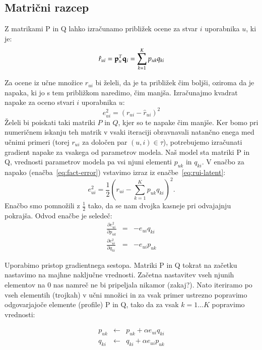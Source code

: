 \subsection{Matrični razcep}

Z matrikami P in Q lahko izračunamo približek ocene za stvar $i$ uporabnika $u$, ki je:
%
\begin{equation}\label{eq:rui-latent}
  \hat{r}_{ui}={\bf p}_u^T {\bf q}_i = \sum_{k=1}^K p_{uk} q_{ki}
\end{equation}

Za ocene iz učne množice $r_{ui}$ bi želeli, da je ta približek čim boljši, oziroma da je napaka, ki jo s tem približkom naredimo, čim manjša. Izračunajmo kvadrat napake za oceno stvari $i$ uporabnika $u$:
%
\begin{equation}\label{eq:fact-error}
  e_{ui}^2 = (r_{ui}-\hat{r}_{ui})^2
\end{equation}
%
Želeli bi poiskati taki matriki $P$ in $Q$, kjer so te napake čim manjše. Ker bomo pri numeričnem iskanju teh matrik v vsaki iteraciji obravnavali natančno enega med učnimi primeri (torej $r_{ui}$ za določen par $(u,i)\in\tau$), potrebujemo izračunati gradient napake za vsakega od parametrov modela. Naš model sta matriki P in Q, vrednosti parametrov modela pa vsi njuni elementi $p_{uk}$ in $q_{ki}$. V enačbo za napako (enačba~\ref{eq:fact-error}) vstavimo izraz iz enačbe~\ref{eq:rui-latent}:
%
\begin{equation}
  e_{ui}^2 = \frac{1}{2}\left(r_{ui}-\sum_{k=1}^K p_{uk} q_{ki}\right)^2.
\end{equation}
%
Enačbo smo pomnožili z $\frac{1}{2}$ tako, da se nam dvojka kasneje pri odvajajnju pokrajša. Odvod enačbe je seledeč:
%
\begin{eqnarray}
  \frac{\partial e_{ui}^2}{\partial p_{uk}} & = & -e_{ui}q_{ki} \\
  \frac{\partial e_{ui}^2}{\partial q_{ki}} & = & -e_{ui}p_{uk} \nonumber
\end{eqnarray}

Uporabimo pristop gradientnega sestopa. Matriki P in Q tokrat na začetku nastavimo na majhne naključne vrednosti. Začetna nastavitev vseh njunih elementov na 0 nas namreč ne bi pripeljala nikamor (zakaj?). Nato iteriramo po vseh elementih (trojkah) v učni množici in za vsak primer ustrezno popravimo odgovarjajoče elemente (profile) P in Q, tako da za vsak $k=1\ldots K$ popravimo vrednosti:

\begin{eqnarray}
  p_{uk} & \leftarrow & p_{uk} + \alpha e_{ui} q_{ki} \\
  q_{ki} & \leftarrow & q_{ki} + \alpha e_{ui} p_{uk} \nonumber
\end{eqnarray}


